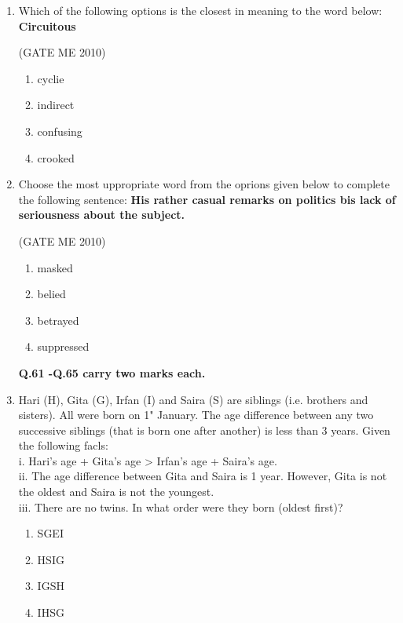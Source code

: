 \documentclass[journal,12pt,onecolumn]{IEEEtran}
\theoremstyle{remark}
\begin{document}
\begin{enumerate}
\item Which of the following options is the closest in meaning to the word below:
\textbf{Circuitous}


\hfill{(GATE  ME 2010)}\\

\begin{enumerate}

\item cyclie
\item indirect
\item confusing
\item crooked
\end{enumerate}


\item Choose the most uppropriate word from the oprions given below to complete the following
sentence:
\textbf{His rather casual remarks on politics bis lack of seriousness about the subject.}

\hfill{(GATE  ME 2010)}\\


\begin{multicols}{4}
\begin{enumerate}

\item  masked
\item  belied
\item  betrayed
\item  suppressed
\end{enumerate}
\end{multicols}



\textbf{ Q.61 -Q.65 carry two marks each.}\\
\item  Hari (H), Gita (G), Irfan (I) and Saira (S) are siblings (i.e. brothers and sisters). All were born on
1" January. The age difference between any two successive siblings (that is born one after another)
is less than 3 years. Given the following facls:\\
i. Hari's age + Gita's age > Irfan's age + Saira's age.\\
ii. The age difference between Gita and Saira is 1 year. However, Gita is not the
oldest and Saira is not the youngest.\\
iii. There are no twins.
In what order were they born (oldest first)?
\begin{enumerate}

\item SGEI
\item  HSIG
\item IGSH
\item IHSG
\end{enumerate}



\end{enumerate}
\end{document}
